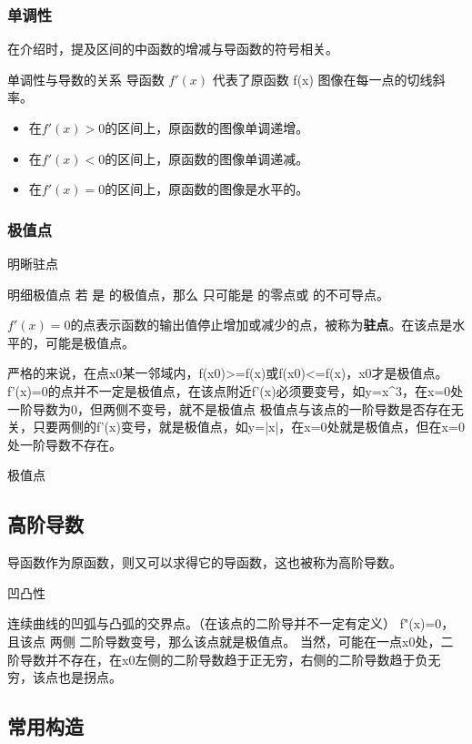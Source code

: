 \subsubsection{单调性}
在介绍时，提及区间的中函数的增减与导函数的符号相关。
\begin{theorem}{单调性与导数的关系}
导函数  $f'(x)$  代表了原函数  f(x)  图像在每一点的切线斜率。
\begin{itemize}
\item 在$f'(x)>0$的区间上，原函数的图像单调递增。
\item 在$f'(x)<0$的区间上，原函数的图像单调递减。
\item 在$f'(x)=0$的区间上，原函数的图像是水平的。
\end{itemize}
\end{theorem}


\subsubsection{极值点}

明晰驻点

明细极值点
若  是 的极值点，那么  只可能是  的零点或 的不可导点。


$f'(x) = 0$的点表示函数的输出值停止增加或减少的点，被称为\textbf{驻点}。在该点是水平的，可能是极值点。

严格的来说，在点x0某一邻域内，f(x0)>=f(x)或f(x0)<=f(x)，x0才是极值点。
f’(x)=0的点并不一定是极值点，在该点附近f’(x)必须要变号，如y=x^3，在x=0处一阶导数为0，但两侧不变号，就不是极值点
极值点与该点的一阶导数是否存在无关，只要两侧的f’(x)变号，就是极值点，如y=|x|，在x=0处就是极值点，但在x=0处一阶导数不存在。

极值点

\subsection{高阶导数}

导函数作为原函数，则又可以求得它的导函数，这也被称为高阶导数。

凹凸性

连续曲线的凹弧与凸弧的交界点。（在该点的二阶导并不一定有定义）
f"(x)=0，且该点 两侧 二阶导数变号，那么该点就是极值点。
当然，可能在一点x0处，二阶导数并不存在，在x0左侧的二阶导数趋于正无穷，右侧的二阶导数趋于负无穷，该点也是拐点。

\subsection{常用构造}


